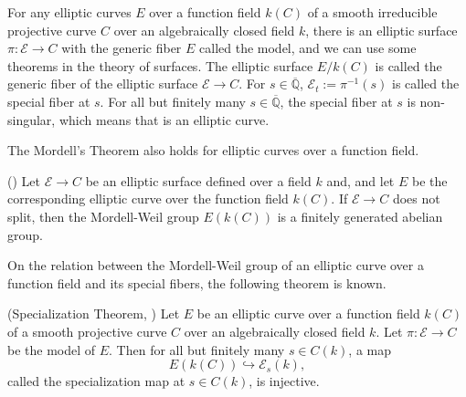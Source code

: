 \documentclass[main]{subfiles}
\begin{document}
For any elliptic curves $E$ over a function field $k(C)$ of a smooth irreducible projective curve $C$ over an algebraically closed field $k$, there is an elliptic surface $\pi: \mathcal{E} \to C$ with the generic fiber $E$ called the \Neron{} model, and we can use some theorems in the theory of surfaces.
The elliptic surface $E/k(C)$ is called the generic fiber of the elliptic surface $\mathcal{E} \to C$.
For $s \in \overline{\mathbb{Q}}$, $\mathcal{E}_t:=\pi^{-1}(s)$ is called the special fiber at $s$.
For all but finitely many $s \in \overline{\mathbb{Q}}$, the special fiber at $s$ is non-singular, which means that is an elliptic curve.

The Mordell's Theorem also holds for elliptic curves over a function field.
\begin{thm}{(\cite[Theorem 6.1.]{ref:advancedaec})}
    \label{thm:mordell_function_field}
    Let $\mathcal{E} \to C$ be an elliptic surface defined over a field $k$ and, and let $E$ be the corresponding elliptic curve over the function field $k(C)$.
    If $\mathcal{E} \to C$ does not split, then the Mordell-Weil group $E(k(C))$ is a finitely generated abelian group.
\end{thm}

On the relation between the Mordell-Weil group of an elliptic curve over a function field and its special fibers, the following theorem is known.
\begin{thm}{(Specialization Theorem, \cite[Theorem 11.4.]{ref:advancedaec})}
    \label{thm:specialization}
    Let $E$ be an elliptic curve over a function field $k(C)$ of a smooth projective curve $C$ over an algebraically closed field $k$.
    Let $\pi: \mathcal{E} \to C$ be the \Neron{} model of $E$.
    Then for all but finitely many $s \in C(k)$, a map
    \begin{equation*}
        E(k(C)) \hookrightarrow \mathcal{E}_{s}(k),
    \end{equation*}
    called the specialization map at $s \in C(k)$, is injective.
\end{thm}
\end{document}
